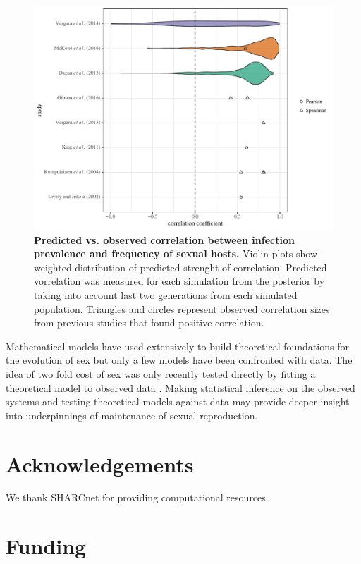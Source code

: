 \documentclass{article}\usepackage[]{graphicx}\usepackage[]{color}
\begin{document}
\begin{figure}[!ht]
\includegraphics[width=\textwidth]{../fig/effect_size.pdf}
\caption{{\bf Predicted vs. observed correlation between infection prevalence and frequency of sexual hosts.}
Violin plots show weighted distribution of predicted strenght of correlation.
Predicted vorrelation was measured for each simulation from the posterior by taking into account last two generations from each simulated population.
Triangles and circles represent observed correlation sizes from previous studies that found positive correlation.
}
\label{fig:effect}
\end{figure}

Mathematical models have used extensively to build theoretical foundations for the evolution of sex but only a few models have been confronted with data.
The idea of two fold cost of sex was only recently tested directly by fitting a theoretical model to observed data \citep{gibson2017two}.
Making statistical inference on the observed systems and testing theoretical models against data may provide deeper insight into underpinnings of maintenance of sexual reproduction.

\section{Acknowledgements}

We thank SHARCnet for providing computational resources. 

\section{Funding}
\end{document}

